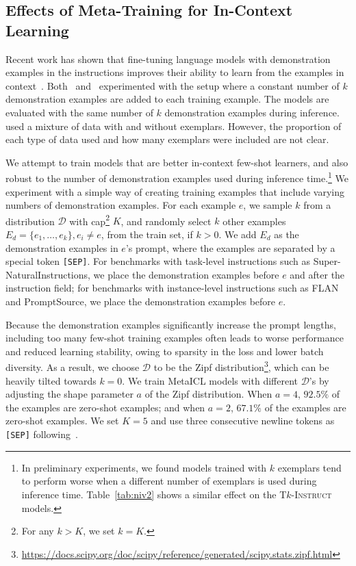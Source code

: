 \subsection{Effects of Meta-Training for In-Context Learning}
\label{subsec:meta-icl}

Recent work has shown that fine-tuning language models with demonstration examples in the instructions improves their ability to learn from the examples in context~\citep{min2021metaicl,wang2022niv2,chung2022flanpalm}. Both~\cite{min2021metaicl} and~\cite{wang2022niv2} experimented with the setup where a constant number of $k$ demonstration examples are added to each training example. The models are evaluated with the same number of $k$ demonstration examples during inference. ~\cite{chung2022flanpalm} used a mixture of data with and without exemplars. However, the proportion of each type of data used and how many exemplars were included are not clear. 

We attempt to train models that are better in-context few-shot learners, and also robust to the number of demonstration examples used during inference time.\footnote{In preliminary experiments, we found models trained with $k$ exemplars tend to perform worse when a different number of exemplars is used during inference time. Table~\ref{tab:niv2} shows a similar effect on the T$k$-\textsc{Instruct} models.} We experiment with a simple way of creating training examples that include varying numbers of demonstration examples. For each example $e$, we sample $k$ from a distribution $\mathcal{D}$ with cap\footnote{For any $k>K$, we set $k=K$.} $K$, and  randomly select $k$ other examples $E_d=\{e_1,\hdots,e_k\}, e_i \neq e$, from the train set, if $k > 0$. We add $E_d$ as the demonstration examples in $e$'s prompt, where the examples are separated by a special token \texttt{[SEP]}. For benchmarks with task-level instructions such as Super-NaturalInstructions, we place the demonstration examples before $e$ and after the instruction field; for benchmarks with instance-level instructions such as FLAN and PromptSource, we place the demonstration examples before $e$. 

Because the demonstration examples significantly increase the prompt lengths, including too many few-shot training examples often leads to worse performance and reduced learning stability, owing to sparsity in the loss and lower batch diversity. As a result, we choose $\mathcal{D}$ to be the Zipf distribution\footnote{\url{https://docs.scipy.org/doc/scipy/reference/generated/scipy.stats.zipf.html}}, which can be heavily tilted towards $k=0$. We train MetaICL models with different $\mathcal{D}$'s by adjusting the shape parameter $a$ of the Zipf distribution. When $a=4$, $92.5\%$ of the examples are zero-shot examples; and when $a=2$, $67.1\%$ of the examples are zero-shot examples. We set $K=5$ and use three consecutive newline tokens as \texttt{[SEP]} following~\cite{min2021metaicl}. 

